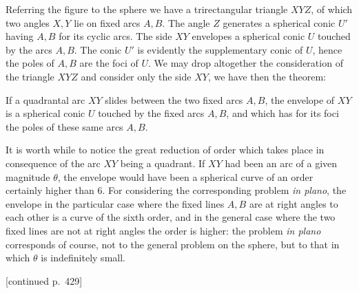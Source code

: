\documentclass[11pt]{article}
\begin{document}
Referring the figure to the sphere we have a trirectangular triangle $XYZ$, of which
two angles $X,Y$ lie on fixed arcs $A,B$. The angle $Z$ generates a spherical conic $U'$
having $A,B$ for its cyclic arcs. The side $XY$ envelopes a spherical conic $U$ touched
by the arcs $A,B$. The conic $U'$ is evidently the supplementary conic of $U$, hence
the poles of $A,B$ are the foci of $U$. We may drop altogether the consideration of
the triangle $XYZ$ and consider only the side $XY$, we have then the theorem:

If a quadrantal arc $XY$ slides between the two fixed arcs $A,B$, the envelope of
$XY$ is a spherical conic $U$ touched by the fixed arcs $A,B$, and which has for its
foci the poles of these same arcs $A,B$.

It is worth while to notice the great reduction of order which takes place in
consequence of the arc $XY$ being a quadrant. If $XY$ had been an arc of a given
magnitude $\theta$, the envelope would have been a spherical curve of an order certainly
higher than 6. For considering the corresponding problem \textit{in plano}, the envelope in
the particular case where the fixed lines $A,B$ are at right angles to each other
is a curve of the sixth order, and in the general case where the two fixed lines are
not at right angles the order is higher: the problem \textit{in plano} corresponds of course,
not to the general problem on the sphere, but to that in which $\theta$ is indefinitely small.

\bigskip
\hfill [continued p.~429]
\end{document}
